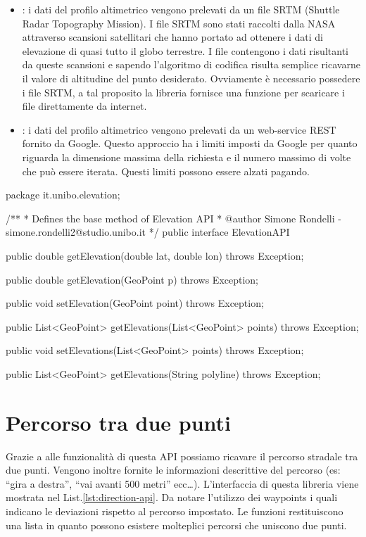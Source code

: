 \begin{itemize}
	\item {}: i dati del profilo altimetrico vengono prelevati da un file SRTM (Shuttle Radar Topography Mission). I file SRTM sono stati raccolti dalla NASA attraverso scansioni satellitari che hanno portato ad ottenere i dati di elevazione di quasi tutto il globo terrestre. I file contengono i dati risultanti da queste scansioni e sapendo l'algoritmo di codifica risulta semplice ricavarne il valore di altitudine del punto desiderato. Ovviamente è necessario possedere i file SRTM, a tal proposito la libreria fornisce una funzione per scaricare i file direttamente da internet.
	\item {}: i dati del profilo altimetrico vengono prelevati da un web-service REST fornito da Google. Questo approccio ha i limiti imposti da Google per quanto riguarda la dimensione massima della richiesta e il numero massimo di volte che può essere iterata. Questi limiti possono essere alzati pagando.
\end{itemize} 

\begin{java}[caption={Interfaccia di Elevation API},label={lst:elevation-api}]
package it.unibo.elevation;

/**
 * Defines the base method of Elevation API
 * @author Simone Rondelli - simone.rondelli2@studio.unibo.it
 */
public interface ElevationAPI {

        public double getElevation(double lat, double lon) throws Exception;

        public double getElevation(GeoPoint p) throws Exception;

        public void setElevation(GeoPoint point) throws Exception;
        
        public List<GeoPoint> getElevations(List<GeoPoint> points) throws Exception;

        public void setElevations(List<GeoPoint> points) throws Exception;

        public List<GeoPoint> getElevations(String polyline) throws Exception;

}
\end{java}

\section{Percorso tra due punti}

Grazie a alle funzionalità di questa API possiamo ricavare il percorso stradale tra due punti. Vengono inoltre fornite le informazioni descrittive del percorso (es: ``gira a destra'', ``vai avanti 500 metri'' ecc\dots). L'interfaccia di questa libreria viene mostrata nel List.\ref{lst:direction-api}. Da notare l'utilizzo dei waypoints i quali indicano le deviazioni rispetto al percorso impostato. Le funzioni restituiscono una lista in quanto possono esistere molteplici percorsi che uniscono due punti.

